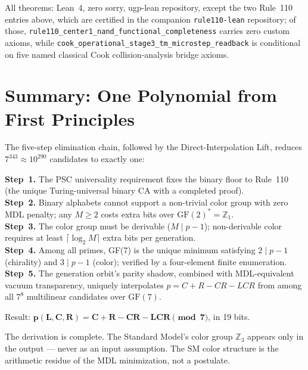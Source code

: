 \documentclass[11pt,a4paper]{article}
\newcommand{\lean}[1]{\texttt{#1}}
\theoremstyle{definition}
\begin{document}
All theorems: Lean~4, zero sorry, ugp-lean repository, except the two Rule~110
entries above, which are certified in the companion \texttt{rule110-lean}
repository; of those, \lean{rule110\_center1\_nand\_functional\_completeness}
carries zero custom axioms, while \lean{cook\_operational\_stage3\_tm\_microstep\_readback}
is conditional on five named classical Cook collision-analysis bridge axioms.

\section{Summary: One Polynomial from First Principles}

The five-step elimination chain, followed by the Direct-Interpolation Lift,
reduces $7^{343} \approx 10^{290}$ candidates to exactly one:

\begin{tcolorbox}[colback=boxblue,colframe=blue!40!black,
  title={The complete derivation, in five sentences}]
\textbf{Step~1.}  The PSC universality requirement fixes the binary floor to
Rule~110 (the unique Turing-universal binary CA with a completed proof).\\
\textbf{Step~2.}  Binary alphabets cannot support a non-trivial color group
with zero MDL penalty; any $M \geq 2$ costs extra bits over
$\mathrm{GF}(2)^* = \mathbb{Z}_1$.\\
\textbf{Step~3.}  The color group must be derivable ($M \mid p-1$);
non-derivable color requires at least $\lceil\log_2 M\rceil$ extra bits per
generation.\\
\textbf{Step~4.}  Among all primes, GF(7) is the unique minimum satisfying
$2 \mid p-1$ (chirality) and $3 \mid p-1$ (color); verified by a
four-element finite enumeration.\\
\textbf{Step~5.}  The generation orbit's parity shadow, combined with
MDL-equivalent vacuum transparency, uniquely interpolates $p = C+R-CR-LCR$
from among all $7^8$ multilinear candidates over $\mathrm{GF}(7)$.

\medskip
Result: $\boldsymbol{p(L,C,R) = C + R - CR - LCR \pmod{7}}$, in 19 bits.
\end{tcolorbox}

\bigskip
\noindent
The derivation is complete.  The Standard Model's color group $\mathbb{Z}_3$
appears only in the output — never as an input assumption.  The SM color
structure is the arithmetic residue of the MDL minimization, not a
postulate.
\end{document}
